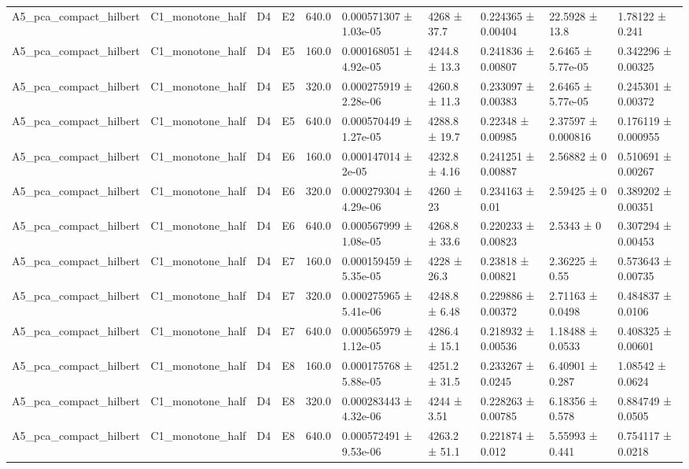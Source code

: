 \begin{table}
\begin{tabular}{llllllllll}
A5\_pca\_compact\_hilbert & C1\_monotone\_half & D4 & E2 & 640.0 & 0.000571307 ± 1.03e-05 & 4268 ± 37.7 & 0.224365 ± 0.00404 & 22.5928 ± 13.8 & 1.78122 ± 0.241 \\
A5\_pca\_compact\_hilbert & C1\_monotone\_half & D4 & E5 & 160.0 & 0.000168051 ± 4.92e-05 & 4244.8 ± 13.3 & 0.241836 ± 0.00807 & 2.6465 ± 5.77e-05 & 0.342296 ± 0.00325 \\
A5\_pca\_compact\_hilbert & C1\_monotone\_half & D4 & E5 & 320.0 & 0.000275919 ± 2.28e-06 & 4260.8 ± 11.3 & 0.233097 ± 0.00383 & 2.6465 ± 5.77e-05 & 0.245301 ± 0.00372 \\
A5\_pca\_compact\_hilbert & C1\_monotone\_half & D4 & E5 & 640.0 & 0.000570449 ± 1.27e-05 & 4288.8 ± 19.7 & 0.22348 ± 0.00985 & 2.37597 ± 0.000816 & 0.176119 ± 0.000955 \\
A5\_pca\_compact\_hilbert & C1\_monotone\_half & D4 & E6 & 160.0 & 0.000147014 ± 2e-05 & 4232.8 ± 4.16 & 0.241251 ± 0.00887 & 2.56882 ± 0 & 0.510691 ± 0.00267 \\
A5\_pca\_compact\_hilbert & C1\_monotone\_half & D4 & E6 & 320.0 & 0.000279304 ± 4.29e-06 & 4260 ± 23 & 0.234163 ± 0.01 & 2.59425 ± 0 & 0.389202 ± 0.00351 \\
A5\_pca\_compact\_hilbert & C1\_monotone\_half & D4 & E6 & 640.0 & 0.000567999 ± 1.08e-05 & 4268.8 ± 33.6 & 0.220233 ± 0.00823 & 2.5343 ± 0 & 0.307294 ± 0.00453 \\
A5\_pca\_compact\_hilbert & C1\_monotone\_half & D4 & E7 & 160.0 & 0.000159459 ± 5.35e-05 & 4228 ± 26.3 & 0.23818 ± 0.00821 & 2.36225 ± 0.55 & 0.573643 ± 0.00735 \\
A5\_pca\_compact\_hilbert & C1\_monotone\_half & D4 & E7 & 320.0 & 0.000275965 ± 5.41e-06 & 4248.8 ± 6.48 & 0.229886 ± 0.00372 & 2.71163 ± 0.0498 & 0.484837 ± 0.0106 \\
A5\_pca\_compact\_hilbert & C1\_monotone\_half & D4 & E7 & 640.0 & 0.000565979 ± 1.12e-05 & 4286.4 ± 15.1 & 0.218932 ± 0.00536 & 1.18488 ± 0.0533 & 0.408325 ± 0.00601 \\
A5\_pca\_compact\_hilbert & C1\_monotone\_half & D4 & E8 & 160.0 & 0.000175768 ± 5.88e-05 & 4251.2 ± 31.5 & 0.233267 ± 0.0245 & 6.40901 ± 0.287 & 1.08542 ± 0.0624 \\
A5\_pca\_compact\_hilbert & C1\_monotone\_half & D4 & E8 & 320.0 & 0.000283443 ± 4.32e-06 & 4244 ± 3.51 & 0.228263 ± 0.00785 & 6.18356 ± 0.578 & 0.884749 ± 0.0505 \\
A5\_pca\_compact\_hilbert & C1\_monotone\_half & D4 & E8 & 640.0 & 0.000572491 ± 9.53e-06 & 4263.2 ± 51.1 & 0.221874 ± 0.012 & 5.55993 ± 0.441 & 0.754117 ± 0.0218 \\

\end{tabular}
\end{table}
